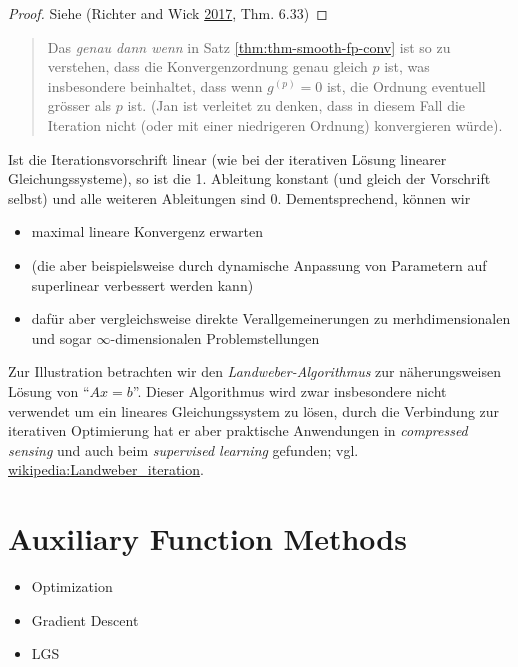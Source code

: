 \documentclass[
]{book}
\providecommand{\tightlist}{%
  \setlength{\itemsep}{0pt}\setlength{\parskip}{0pt}}
\newenvironment {JHSAYS} [0] {\begin{quote}\color{jhsc}} {\end{quote}}
\theoremstyle{definition}
\theoremstyle{definition}
\theoremstyle{definition}
\theoremstyle{definition}
\theoremstyle{remark}
\begin{document}
\begin{proof}
Siehe (Richter and Wick \protect\hyperlink{ref-RicW17}{2017}, Thm. 6.33)
\end{proof}

\leavevmode\hypertarget{rem-smooth-fp-conv}{}%
\begin{JHSAYS}
Das \emph{genau dann wenn} in Satz \ref{thm:thm-smooth-fp-conv} ist so zu verstehen, dass die Konvergenzordnung genau gleich \(p\) ist, was insbesondere beinhaltet, dass wenn \(g^{(p)}=0\) ist, die Ordnung eventuell grösser als \(p\) ist. (Jan ist verleitet zu denken, dass in diesem Fall die Iteration nicht (oder mit einer niedrigeren Ordnung) konvergieren würde).

\end{JHSAYS}

Ist die Iterationsvorschrift linear (wie bei der iterativen Lösung linearer Gleichungssysteme), so ist die 1. Ableitung konstant (und gleich der Vorschrift selbst) und alle weiteren Ableitungen sind \(0\). Dementsprechend, können wir

\begin{itemize}
\tightlist
\item
  maximal lineare Konvergenz erwarten
\item
  (die aber beispielsweise durch dynamische Anpassung von Parametern auf superlinear verbessert werden kann)
\item
  dafür aber vergleichsweise direkte Verallgemeinerungen zu merhdimensionalen und sogar \(\infty\)-dimensionalen Problemstellungen
\end{itemize}

Zur Illustration betrachten wir den \emph{Landweber-Algorithmus} zur näherungsweisen Lösung von ``\(Ax=b\)''.
Dieser Algorithmus wird zwar insbesondere nicht verwendet um ein lineares Gleichungssystem zu lösen, durch die Verbindung zur iterativen Optimierung hat er aber praktische Anwendungen in \emph{compressed sensing} und auch beim \emph{supervised learning} gefunden; vgl. \href{https://en.wikipedia.org/wiki/Landweber_iteration}{wikipedia:Landweber\_iteration}.

\hypertarget{auxiliary-function-methods}{%
\section{Auxiliary Function Methods}\label{auxiliary-function-methods}}

\begin{itemize}
\tightlist
\item
  Optimization
\item
  Gradient Descent
\item
  LGS
\end{itemize}
\end{document}
